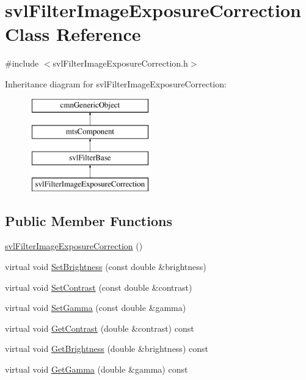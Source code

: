 \hypertarget{classsvl_filter_image_exposure_correction}{}\section{svl\+Filter\+Image\+Exposure\+Correction Class Reference}
\label{classsvl_filter_image_exposure_correction}


{\ttfamily \#include $<$svl\+Filter\+Image\+Exposure\+Correction.\+h$>$}

Inheritance diagram for svl\+Filter\+Image\+Exposure\+Correction\+:\begin{figure}[H]
\begin{center}
\leavevmode
\includegraphics[height=4.000000cm]{d7/d67/classsvl_filter_image_exposure_correction}
\end{center}
\end{figure}
\subsection*{Public Member Functions}
\begin{DoxyCompactItemize}
\item 
\hyperlink{classsvl_filter_image_exposure_correction_acd892bb66f257297e11518d2b93706b1}{svl\+Filter\+Image\+Exposure\+Correction} ()
\item 
virtual void \hyperlink{classsvl_filter_image_exposure_correction_a09f3aa4f9f29dbde3fb1ed565c737904}{Set\+Brightness} (const double \&brightness)
\item 
virtual void \hyperlink{classsvl_filter_image_exposure_correction_a8a4f40967e8abc49934d4e514f09a166}{Set\+Contrast} (const double \&contrast)
\item 
virtual void \hyperlink{classsvl_filter_image_exposure_correction_a44913ba8e0aaa21de0c90f72a51f4795}{Set\+Gamma} (const double \&gamma)
\item 
virtual void \hyperlink{classsvl_filter_image_exposure_correction_a2506c87f18f13186251e9b509e988e46}{Get\+Contrast} (double \&contrast) const 
\item 
virtual void \hyperlink{classsvl_filter_image_exposure_correction_a3ed1e0a4605433b521314a4c3be08ed9}{Get\+Brightness} (double \&brightness) const 
\item 
virtual void \hyperlink{classsvl_filter_image_exposure_correction_a7ed624936a28e3560c6c7c396c2f72c1}{Get\+Gamma} (double \&gamma) const 
\end{DoxyCompactItemize}
